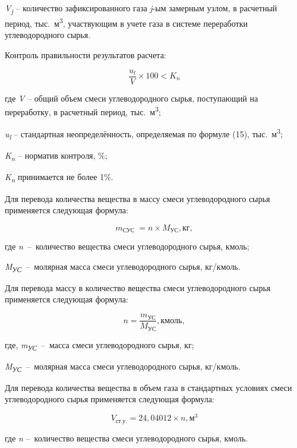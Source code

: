 \begin{multicols}{2}
\emph{V\textsubscript{j}} -- количество зафиксированного газа
\emph{j}-ым замерным узлом, в расчетный период,
тыс.~м\textsuperscript{3}, участвующим в учете газа в системе
переработки углеводородного сырья.

Контроль правильности результатов расчета:

\begin{equation}
\frac{u_{l}}{V} \times 100 < K_{n}
\end{equation}

где \emph{V} -- общий объем смеси углеводородного сырья, поступающий на
переработку, в расчетный период, тыс.~м\textsuperscript{3};

\emph{u\textsubscript{l}} -- стандартная неопределённость, определяемая
по формуле (15), тыс.~м\textsuperscript{3};

\emph{K\textsubscript{n}} -- норматив контроля, \%;

\emph{K\textsubscript{n}} принимается не более 1\%.

Для перевода количества вещества в массу смеси углеводородного сырья
применяется следующая формула:

\begin{equation}
m_{\text{СУС}}\  = n \times M_{\text{УС}}, \text{кг},
\end{equation}

где \emph{n}~--~количество вещества смеси углеводородного сырья, кмоль;

\emph{M\textsubscript{УС}}~--~молярная масса смеси углеводородного
сырья, кг/кмоль.

Для перевода массу в количество вещества смеси углеводородного сырья
применяется следующая формула:

\begin{equation*}
n = \frac{m_{\text{УС}}}{M_{\text{УС}}}, \text{кмоль},
\end{equation*}

где, \emph{m\textsubscript{УС}}~--~масса смеси углеводородного сырья,
кг;

\emph{M\textsubscript{УС}}~--~молярная масса смеси углеводородного
сырья, кг/кмоль.

Для перевода количества вещества в объем газа в стандартных условиях
смеси углеводородного сырья применяется следующая формула:

\begin{equation}
V_{\text{ст.у.}} = 24,04012 \times n, \text{м}^3
\end{equation}

где \emph{n} --~количество вещества смеси углеводородного сырья, кмоль.


\end{multicols}
